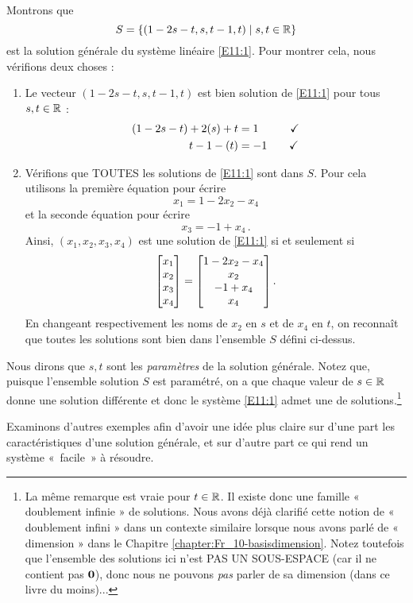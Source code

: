 \begin{myexample} Montrons que
$$
S = \{ (1-2s-t, s, t-1, t) \mid s,t\in \mathbb{R}\}
$$
est la solution générale du système linéaire \eqref{E11:1}.
Pour montrer cela, nous vérifions deux choses :
\begin{enumerate}[(1)]
	\item Le vecteur $(1-2s-t, s, t-1, t)$ est bien solution de \eqref{E11:1}
pour tous $s,t\in\mathbb{R}$ :
\begin{align*}
(1-2s-t) + 2(s) + t &= 1 \qquad \hspace{0.3cm}\checkmark \\
t-1 - (t) &= -1 \qquad \checkmark
\end{align*}
	\item Vérifions que TOUTES les solutions de \eqref{E11:1} sont dans $S$.  Pour cela utilisons la 
première équation pour écrire
$$
x_1 = 1-2x_2-x_4
$$
et la seconde équation pour écrire
$$
x_3 = -1+x_4\,.
$$
Ainsi, $(x_1,x_2,x_3,x_4)$ est une solution de \eqref{E11:1} si et seulement si
$$
\left[ \begin{matrix} x_1\\x_2\\x_3\\x_4 \end{matrix} \right] = \left[ \begin{matrix} 1-2x_2-x_4\\x_2\\ -1+x_4\\ x_4 \end{matrix} \right].
$$
En changeant respectivement les noms de $x_2$ en $s$ et de $x_4$ en $t$, on reconnaît que toutes les solutions sont bien dans
 l'ensemble $S$ défini ci-dessus.
 \end{enumerate}
Nous dirons que $s,t$ sont les \emph{paramètres} de la solution générale.
Notez que, puisque l'ensemble solution $S$ est paramétré, on a que chaque valeur de $s\in \mathbb{R}$ donne une solution différente et donc le système \eqref{E11:1} 
admet une  de solutions.\footnote{La même remarque est vraie pour $t\in\mathbb{R}$. Il existe donc une famille « doublement infinie » de solutions. Nous avons déjà clarifi\'e cette notion de « doublement infini » dans un contexte similaire lorsque nous avons parlé de « dimension »  dans le Chapitre \ref{chapter:Fr_10-basisdimension}. Notez toutefois que l'ensemble des solutions ici n'est PAS UN SOUS-ESPACE (car il ne contient pas $\mathbf{0}$), donc nous ne pouvons \emph{pas} parler de sa dimension (dans ce livre du moins)... }  
\end{myexample}


Examinons d'autres exemples afin d'avoir une idée plus claire sur  d'une part les caractéristiques d'une solution générale, et sur d'autre part ce qui rend un système «~facile~» à résoudre.

